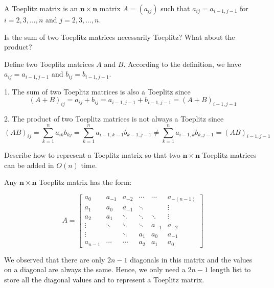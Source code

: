 \newpage
{} %

\problemdes

A Toeplitz matrix is an $\boldsymbol{n} \times \boldsymbol{n}$ matrix $A=\left(a_{i j}\right)$ such that $a_{i j}=a_{i-1, j-1}$ for $i = 2,3,...,n$ and $j = 2,3,...,n$.


Is the sum of two Toeplitz matrices necessarily Toeplitz? What about the product?

\solution

Define two Toeplitz matrices $A$ and $B$. According to the definition, we have $a_{i j}=a_{i-1, j-1}$ and $b_{i j}=b_{i-1, j-1}$.

1. The sum of two Toeplitz matrices is also a Toeplitz since $$(A+B)_{i j} = a_{i j}+b_{i j}=a_{i-1, j-1}+b_{i-1, j-1}=(A+B)_{i-1,j-1}$$

2. The product of two Toeplitz matrices is not always a Toeplitz since $$(AB)_{i j}=\sum_{k=1}^{n}{a_{i k}b_{k j}} = \sum_{k=1}^{n}{a_{i-1, k-1}b_{k-1, j-1}} \neq  \sum_{k=1}^{n}{a_{i-1, k}b_{k, j-1}} = (AB)_{i-1, j-1}$$




Describe how to represent a Toeplitz matrix so that two $\boldsymbol{n} \times \boldsymbol{n}$ Toeplitz matrices can be added in $O(n)$ time.

\solution

Any $\boldsymbol{n} \times \boldsymbol{n}$ Toeplitz matrix has the form:

$$A=\left[\begin{array}{cccccc}{a_{0}} & {a_{-1}} & {a_{-2}} & {\cdots} & {\cdots} & {a_{-(n-1)}} \\ {a_{1}} & {a_{0}} & {a_{-1}} & {\ddots} & {} & {\vdots} \\ {a_{2}} & {a_{1}} & {\ddots} & {\ddots} & {\ddots} & {\vdots} \\ {\vdots} & {\ddots} & {\ddots} & {\ddots} & {a_{-1}} & {a_{-2}} \\ {\vdots} & {} & {\ddots} & {a_{1}} & {a_{0}} & {a_{-1}} \\ {a_{n-1}} & {\cdots} & {\cdots} & {a_{2}} & {a_{1}} & {a_{0}}\end{array}\right]$$

We observed that there are only $2n-1$ diagonals in this matrix and the values on a diagonal are always the same. Hence, we only need a $2n-1$ length list to store all the diagonal values and to represent a Toeplitz matrix. 

